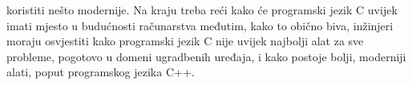 koristiti nešto modernije. Na kraju treba reći kako će programski jezik C uvijek imati mjesto u budućnosti računarstva međutim, kako to obično biva, inžinjeri moraju osvjestiti kako programski jezik C nije uvijek najbolji alat za sve probleme, pogotovo u domeni ugradbenih uređaja, i kako postoje bolji, moderniji alati, poput programskog jezika C++. 